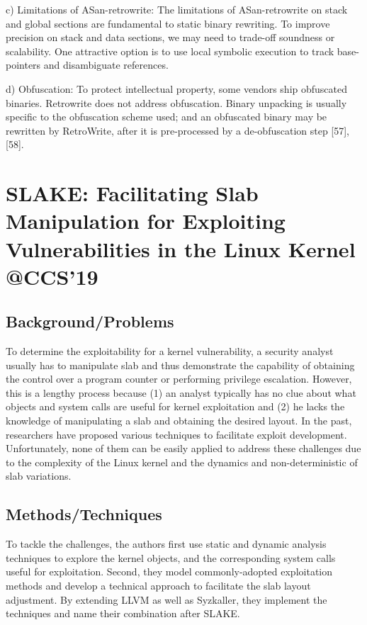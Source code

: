 c) Limitations of ASan-retrowrite: The limitations of ASan-retrowrite on stack and global sections are fundamental to static binary rewriting. To improve precision on stack and data sections, we may need to trade-off soundness or scalability. One attractive option is to use local symbolic execution to track base-pointers and disambiguate references.  

d) Obfuscation: To protect intellectual property, some vendors ship obfuscated binaries. Retrowrite does not address obfuscation. Binary unpacking is usually specific to the obfuscation scheme used; and an obfuscated binary may be rewritten by RetroWrite, after it is pre-processed by a de-obfuscation step [57], [58].
\newpage
\section{SLAKE: Facilitating Slab Manipulation for Exploiting
Vulnerabilities in the Linux Kernel @CCS'19}

\subsection{Background/Problems}
To determine the exploitability for a kernel vulnerability, a security analyst usually has to manipulate slab and thus demonstrate the capability of obtaining the control over a program counter or performing privilege escalation. However, this is a lengthy process because (1) an analyst typically has no clue about what objects and system calls are useful for kernel exploitation and (2) he lacks the knowledge of manipulating a slab and obtaining the desired layout. In the past, researchers have proposed various techniques to facilitate exploit development. Unfortunately, none of them can be easily applied to address these challenges due to the complexity of the Linux kernel and the dynamics and non-deterministic of slab variations.
\subsection{Methods/Techniques}
To tackle the challenges, the authors first use static and dynamic analysis techniques to explore the kernel objects, and the corresponding system calls useful for exploitation. Second, they model commonly-adopted exploitation methods and develop a technical approach to facilitate the slab layout adjustment. By extending LLVM as well as Syzkaller, they implement the techniques and name their combination after SLAKE. 

